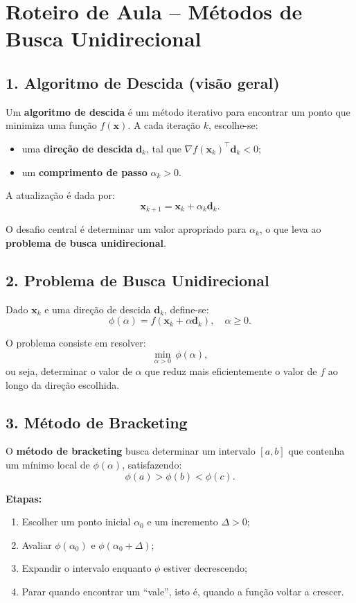 \documentclass[9pt,a4paper]{extarticle}
\begin{document}
\section*{Roteiro de Aula -- Métodos de Busca Unidirecional}

\subsection*{1. Algoritmo de Descida (visão geral)}

Um \textbf{algoritmo de descida} é um método iterativo para encontrar um ponto que minimiza uma função \( f(\bm{x}) \).
A cada iteração \( k \), escolhe-se:
\begin{itemize}
  \item uma \textbf{direção de descida} \( \bm{d}_k \), tal que \( \nabla f(\bm{x}_k)^\top \bm{d}_k < 0 \);
  \item um \textbf{comprimento de passo} \( \alpha_k > 0 \).
\end{itemize}

A atualização é dada por:
\[
\bm{x}_{k+1} = \bm{x}_k + \alpha_k \bm{d}_k.
\]

O desafio central é determinar um valor apropriado para \( \alpha_k \), o que leva ao \textbf{problema de busca unidirecional}.

\subsection*{2. Problema de Busca Unidirecional}

Dado \( \bm{x}_k \) e uma direção de descida \( \bm{d}_k \), define-se:
\[
\phi(\alpha) = f(\bm{x}_k + \alpha \bm{d}_k), \quad \alpha \ge 0.
\]

O problema consiste em resolver:
\[
\min_{\alpha > 0} \, \phi(\alpha),
\]
ou seja, determinar o valor de \( \alpha \) que reduz mais eficientemente o valor de \( f \) ao longo da direção escolhida.

\subsection*{3. Método de Bracketing}

O \textbf{método de bracketing} busca determinar um intervalo \( [a,b] \) que contenha um mínimo local de \( \phi(\alpha) \), satisfazendo:
\[
\phi(a) > \phi(b) < \phi(c).
\]

\textbf{Etapas:}
\begin{enumerate}
  \item Escolher um ponto inicial \( \alpha_0 \) e um incremento \( \Delta > 0 \);
  \item Avaliar \( \phi(\alpha_0) \) e \( \phi(\alpha_0 + \Delta) \);
  \item Expandir o intervalo enquanto \( \phi \) estiver decrescendo;
  \item Parar quando encontrar um “vale”, isto é, quando a função voltar a crescer.
\end{enumerate}
\end{document}
